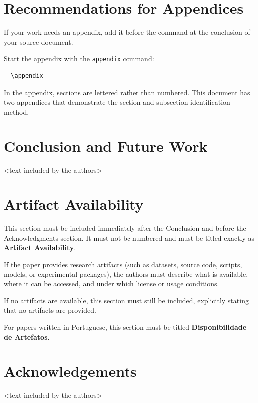 \section{Recommendations for Appendices}

If your work needs an appendix, add it before the \verb|| command at the conclusion of your source document.

Start the appendix with the \verb|appendix| command:
\begin{verbatim}
  \appendix
\end{verbatim}

In the appendix, sections are lettered rather than numbered. This document has two appendices that demonstrate the section and subsection identification method.

\section{Conclusion and Future Work}
<text included by the authors>

\section*{Artifact Availability}
This section must be included immediately after the Conclusion and before the Acknowledgments section. It must not be numbered and must be titled exactly as \textbf{Artifact Availability}.

If the paper provides research artifacts (such as datasets, source code, scripts, models, or experimental packages), the authors must describe what is available, where it can be accessed, and under which license or usage conditions.

If no artifacts are available, this section must still be included, explicitly stating that no artifacts are provided.

For papers written in Portuguese, this section must be titled
\textbf{Disponibilidade de Artefatos}.

\section*{Acknowledgements}
<text included by the authors>




\appendix

